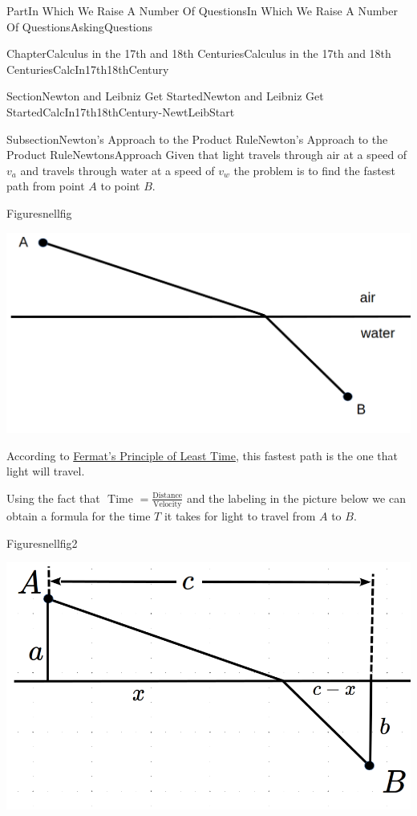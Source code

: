 \documentclass[oneside,10pt,]{book}
\numberwithin{equation}{part}
\begin{document}
\begin{partptx}{Part}{In Which We Raise A Number Of Questions}{}{In Which We Raise A Number Of Questions}{}{}{AskingQuestions}
\begin{chapterptx}{Chapter}{Calculus in the 17th and 18th Centuries}{}{Calculus in the 17th and 18th Centuries}{}{}{CalcIn17th18thCentury}
\begin{sectionptx}{Section}{Newton and Leibniz Get Started}{}{Newton and Leibniz Get Started}{}{}{CalcIn17th18thCentury-NewtLeibStart}
\begin{subsectionptx}{Subsection}{Newton's Approach to the Product Rule}{}{Newton's Approach to the Product Rule}{}{}{NewtonsApproach}
Given that light travels through air at a speed of \(v_a\) and travels through water at a speed of \(v_w\) the problem is to find the fastest path from point \(A\) to point \(B\).%
\begin{figureptx}{Figure}{}{snellfig}{}%
\begin{image}{0.225}{0.55}{0.225}{}%
\includegraphics[width=\linewidth]{external/images/snellfig-1.png}
\end{image}%
\tcblower
\end{figureptx}%
According to \href{https://en.wikipedia.org/wiki/Fermat\%27s_principle}{Fermat's Principle of Least Time}, this fastest path is the one that light will travel.%
\par
Using the fact that \(\text{ Time }=\frac{\text{Distance}}{\text{Velocity}}\) and the labeling in the picture below we can obtain a formula for the time \(T\) it takes for light to travel from \(A\) to \(B\).%
\begin{figureptx}{Figure}{}{snellfig2}{}%
\begin{image}{0.225}{0.55}{0.225}{}%
\includegraphics[width=\linewidth]{external/images/snellfig2-1.png}
\end{image}%

\end{figureptx}
\end{subsectionptx}
\end{sectionptx}
\end{chapterptx}
\end{partptx}
\end{document}
